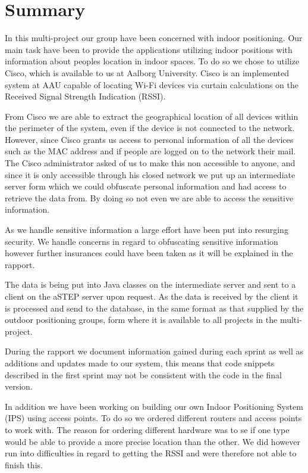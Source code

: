 \chapter*{Summary}
In this multi-project our group have been concerned with indoor positioning. Our main task have been to provide the applications utilizing indoor positions with information about peoples location in indoor spaces. To do so we chose to utilize Cisco, which is available to us at Aalborg University. Cisco is an implemented system at AAU capable of locating Wi-Fi devices via curtain calculations on the Received Signal Strength Indication (RSSI).

From Cisco we are able to extract the geographical location of all devices within the perimeter of the system, even if the device is not connected to the network. However, since Cisco grants us access to personal information of all the devices such as the MAC address and if people are logged on to the network their mail. The Cisco administrator asked of us to make this non accessible to anyone, and since it is only accessible through his closed network we put up an intermediate server form which we could obfuscate personal information and had access to retrieve the data from. By doing so not even we are able to access the sensitive information. 

As we handle sensitive information a large effort have been put into resurging security. We handle concerns in regard to obfuscating sensitive information however further insurances could have been taken as it will be explained in the rapport.

The data is being put into Java classes on the intermediate server and sent to a client on the aSTEP server upon request. As the data is received by the client it is processed and send to the database, in the same format as that supplied by the outdoor positioning groups, form where it is available to all projects in the multi-project.

During the rapport we document information gained during each sprint as well as additions and updates made to our system, this means that code snippets described in the first sprint may not be consistent with the code in the final version.

In addition we have been working on building our own Indoor Positioning System (IPS) using access points. To do so we ordered different routers and access points to work with. The reason for ordering different hardware was to se if one type would be able to provide a more precise location than the other. We did however run into difficulties in regard to getting the RSSI and were therefore not able to finish this.

